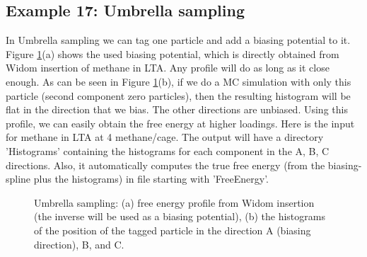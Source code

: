 \subsection*{Example 17: Umbrella sampling}

In Umbrella sampling we can tag one particle and add a biasing potential to it. Figure \ref{Fig: umbrealla sampling}(a)
shows the used biasing potential, which is directly obtained from Widom insertion of methane in LTA. Any profile will
do as long as it close enough. 
As can be seen in Figure \ref{Fig: umbrealla sampling}(b), if we do a MC simulation
with only this particle (second component zero particles), 
then the resulting histogram will be flat in the direction that we bias. The other directions are unbiased.
Using this profile, we can easily obtain the free energy at higher loadings. Here is the input for methane in LTA at 4 methane/cage.
The output will have a directory 'Histograms' containing the histograms for each component in the A, B, C directions. Also, it automatically
computes the true free energy (from the biasing-spline plus the histograms) in file starting with 'FreeEnergy'.

\begin{figure}[t]
  \centering
  \caption{Umbrella sampling: (a) free energy profile from Widom insertion (the inverse will be used as a biasing potential),
           (b) the histograms of the position of the tagged particle in the direction A (biasing direction), B, and C.}
  \label{Fig: umbrealla sampling}
\end{figure}

